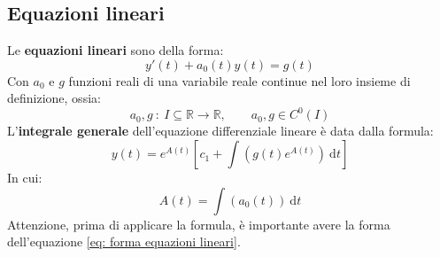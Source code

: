 \documentclass[a4paper]{article}
\newcommand{\definition}[1]{\textcolor{Red3}{\textbf{#1}}}
\begin{document}

	\subsection{Equazioni lineari}

	Le \definition{equazioni lineari} sono della forma:
	\begin{equation}\label{eq: forma equazioni lineari}
		y'\left(t\right) + a_{0}\left(t\right)y\left(t\right) = g\left(t\right)
	\end{equation}
	Con $a_{0}$ e $g$ funzioni reali di una variabile reale continue nel loro insieme di definizione, ossia:
	\begin{equation*}
		a_{0}, g \: : \: I \subseteq \mathbb{R} \rightarrow \mathbb{R}, \hspace{2em} a_{0}, g \in C^{0}\left(I\right)
	\end{equation*}
	L'\definition{integrale generale} dell'equazione differenziale lineare è data dalla formula:
	\begin{equation*}
		y\left(t\right) = e^{A\left(t\right)} \left[c_{1} + \displaystyle\int\left(g\left(t\right) e^{A\left(t\right)}\right) \: \mathrm{d}t \right]
	\end{equation*}
	In cui:
	\begin{equation*}
		A\left(t\right) = \displaystyle\int \left(a_{0}\left(t\right)\right) \:\mathrm{d}t
	\end{equation*}
	Attenzione, prima di applicare la formula, è importante avere la forma dell'equazione \ref{eq: forma equazioni lineari}.
\end{document}
